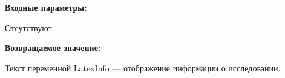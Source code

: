 \textbf{Входные параметры:}

Отсутствуют.

\textbf{Возвращаемое значение:}

Текст переменной LatexInfo --- отображение информации о исследовании.